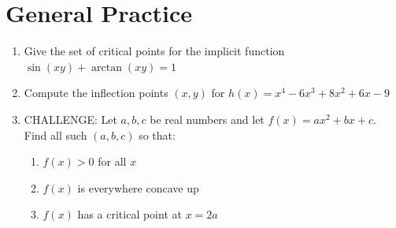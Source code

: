 \documentclass{article}
\begin{document}
\section*{General Practice}
\begin{enumerate}
    \item Give the set of critical points for the implicit function $\sin(xy)+\arctan(xy) = 1$
    \vfill
    \item Compute the inflection points $(x, y)$ for $h(x) = x^4-6x^3+8x^2+6x-9$
    \vfill
    \item CHALLENGE: Let $a, b, c$ be real numbers and let $f(x) = ax^2+bx+c$. Find all such $(a, b, c)$ so that:
    \begin{enumerate}
        \item $f(x)>0$ for all $x$
        \item $f(x)$ is everywhere concave up
        \item $f(x)$ has a critical point at $x = 2a$
        \vfill
    \end{enumerate}
\end{enumerate}
\end{document}
